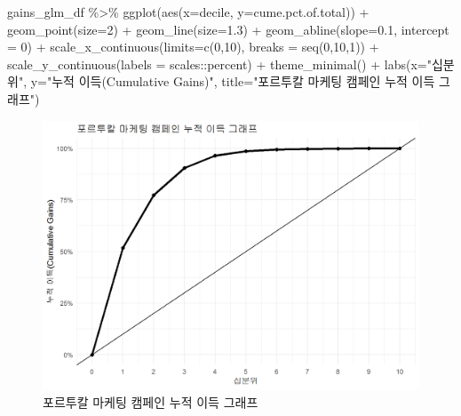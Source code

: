 \documentclass[
  letterpaper,
  chapter,a4paper,showtrims,openright,hidelinks]{oblivoir}
\newenvironment{Shaded}{\begin{snugshade}}{\end{snugshade}}
\newcommand{\AttributeTok}[1]{\textcolor[rgb]{0.40,0.45,0.13}{#1}}
\newcommand{\DecValTok}[1]{\textcolor[rgb]{0.68,0.00,0.00}{#1}}
\newcommand{\FloatTok}[1]{\textcolor[rgb]{0.68,0.00,0.00}{#1}}
\newcommand{\FunctionTok}[1]{\textcolor[rgb]{0.28,0.35,0.67}{#1}}
\newcommand{\NormalTok}[1]{\textcolor[rgb]{0.00,0.23,0.31}{#1}}
\newcommand{\SpecialCharTok}[1]{\textcolor[rgb]{0.37,0.37,0.37}{#1}}
\newcommand{\StringTok}[1]{\textcolor[rgb]{0.13,0.47,0.30}{#1}}
\begin{document}
\begin{Shaded}
\begin{Highlighting}[]
\NormalTok{gains\_glm\_df }\SpecialCharTok{\%\textgreater{}\%} 
    \FunctionTok{ggplot}\NormalTok{(}\FunctionTok{aes}\NormalTok{(}\AttributeTok{x=}\NormalTok{decile, }\AttributeTok{y=}\NormalTok{cume.pct.of.total)) }\SpecialCharTok{+}
      \FunctionTok{geom\_point}\NormalTok{(}\AttributeTok{size=}\DecValTok{2}\NormalTok{) }\SpecialCharTok{+}
      \FunctionTok{geom\_line}\NormalTok{(}\AttributeTok{size=}\FloatTok{1.3}\NormalTok{) }\SpecialCharTok{+}
      \FunctionTok{geom\_abline}\NormalTok{(}\AttributeTok{slope=}\FloatTok{0.1}\NormalTok{, }\AttributeTok{intercept =} \DecValTok{0}\NormalTok{) }\SpecialCharTok{+}
      \FunctionTok{scale\_x\_continuous}\NormalTok{(}\AttributeTok{limits=}\FunctionTok{c}\NormalTok{(}\DecValTok{0}\NormalTok{,}\DecValTok{10}\NormalTok{), }\AttributeTok{breaks =} \FunctionTok{seq}\NormalTok{(}\DecValTok{0}\NormalTok{,}\DecValTok{10}\NormalTok{,}\DecValTok{1}\NormalTok{)) }\SpecialCharTok{+}
      \FunctionTok{scale\_y\_continuous}\NormalTok{(}\AttributeTok{labels =}\NormalTok{ scales}\SpecialCharTok{::}\NormalTok{percent) }\SpecialCharTok{+}
      \FunctionTok{theme\_minimal}\NormalTok{() }\SpecialCharTok{+}
      \FunctionTok{labs}\NormalTok{(}\AttributeTok{x=}\StringTok{"십분위"}\NormalTok{, }\AttributeTok{y=}\StringTok{"누적 이득(Cumulative Gains)"}\NormalTok{, }\AttributeTok{title=}\StringTok{"포르투칼 마케팅 캠페인 누적 이득 그래프"}\NormalTok{) }
\end{Highlighting}
\end{Shaded}

\begin{figure}

{\centering \includegraphics{images/model_value_gain.png}

}

\caption{포르투칼 마케팅 캠페인 누적 이득 그래프}

\end{figure}
\end{document}
